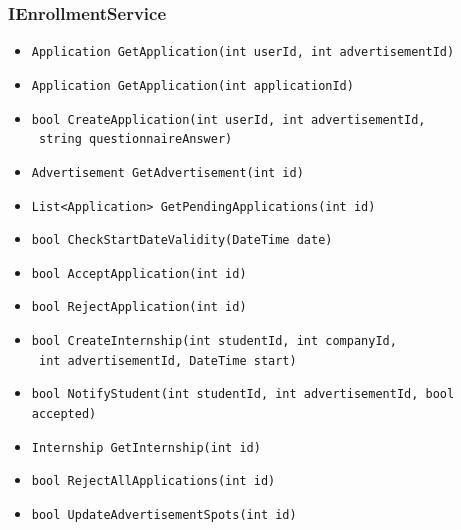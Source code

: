 \subsubsection{IEnrollmentService}
\begin{itemize}
    \item \verb|Application GetApplication(int userId, int advertisementId)|
    \item \verb|Application GetApplication(int applicationId)|
    \item \verb|bool CreateApplication(int userId, int advertisementId,| \\ \makebox[10em][l]{} \verb| string questionnaireAnswer)|
    \item \verb|Advertisement GetAdvertisement(int id)|
    \item \verb|List<Application> GetPendingApplications(int id)|
    \item \verb|bool CheckStartDateValidity(DateTime date)|
    \item \verb|bool AcceptApplication(int id)|
    \item \verb|bool RejectApplication(int id)|
    \item \verb|bool CreateInternship(int studentId, int companyId,| \\ \makebox[10em][l]{} \verb| int advertisementId, DateTime start)|
    \item \verb|bool NotifyStudent(int studentId, int advertisementId, bool accepted)|
    \item \verb|Internship GetInternship(int id)|
    \item \verb|bool RejectAllApplications(int id)|
    \item \verb|bool UpdateAdvertisementSpots(int id)|
\end{itemize}

